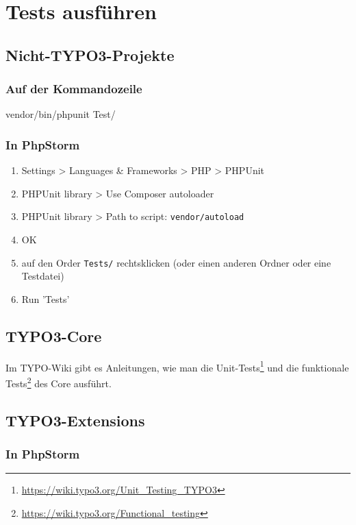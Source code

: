 \documentclass[a4paper,11pt,headsepline]{scrartcl}
\begin{document}
\pagebreak
\section{Tests ausführen}

\subsection{Nicht-TYPO3-Projekte}

\subsubsection{Auf der Kommandozeile}

\begin{bashcode}
vendor/bin/phpunit Test/
\end{bashcode}

\subsubsection{In PhpStorm}
\begin{enumerate}
  \item Settings > Languages \& Frameworks > PHP > PHPUnit
  \item PHPUnit library > Use Composer autoloader
  \item PHPUnit library > Path to script: \texttt{vendor/autoload}
  \item OK
  \item auf den Order \texttt{Tests/} rechtsklicken (oder einen anderen Ordner oder eine Testdatei)
  \item Run 'Tests'
\end{enumerate}


\subsection{TYPO3-Core}

Im TYPO-Wiki gibt es Anleitungen, wie man die Unit-Tests\footnote{\url{https://wiki.typo3.org/Unit_Testing_TYPO3}} und die funktionale Tests\footnote{\url{https://wiki.typo3.org/Functional_testing}} des Core ausführt.


\subsection{TYPO3-Extensions}

\subsubsection{In PhpStorm}
\end{document}
